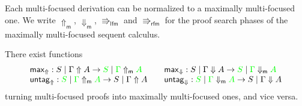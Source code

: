 \documentclass[runningheads]{llncs}
\newcommand{\lfm}{\Rrightarrow_\mathsf{lfm}}
\newcommand{\rfm}{\Rrightarrow_\mathsf{rfm}}
\newcommand{\lf}{\Rrightarrow_\mathsf{lf}}
\newcommand{\rf}{\Rrightarrow_\mathsf{rf}}
\newcommand{\green}[1]{{\color{green}#1}}
\newcommand{\up}{\Uparrow}
\newcommand{\dn}{\Downarrow}
\newcommand{\upm}{\Uparrow_{\mathsf{m}}}
\newcommand{\dnm}{\Downarrow_{\mathsf{m}}}
\begin{document}
Each multi-focused derivation can be normalized to a maximally multi-focused one. We write $\upm$, $\dnm$, $\lfm$ and $\rfm$ for the proof search phases of the maximally multi-focused sequent calculus.
\begin{theorem}\label{thm2}
  There exist functions
  \[
  \begin{array}{l@{\qquad}l}
    \mathsf{max}_\up : S \mid \Gamma \up A \to \green{S} \mid \green{\Gamma} \upm \green{A} &
    \mathsf{max}_\dn : S \mid \Gamma \dn A \to \green{S} \mid \green{\Gamma} \dnm \green{A} \\
    \mathsf{untag}_\up : \green{S} \mid \green{\Gamma} \upm \green{A} \to S \mid \Gamma \up A &
\mathsf{untag}_\dn : \green{S} \mid \green{\Gamma} \dnm \green{A} \to S \mid \Gamma \dn A 
  \end{array}
  \]
 turning multi-focused proofs into maximally multi-focused ones, and vice versa.
\end{theorem}
\end{document}
